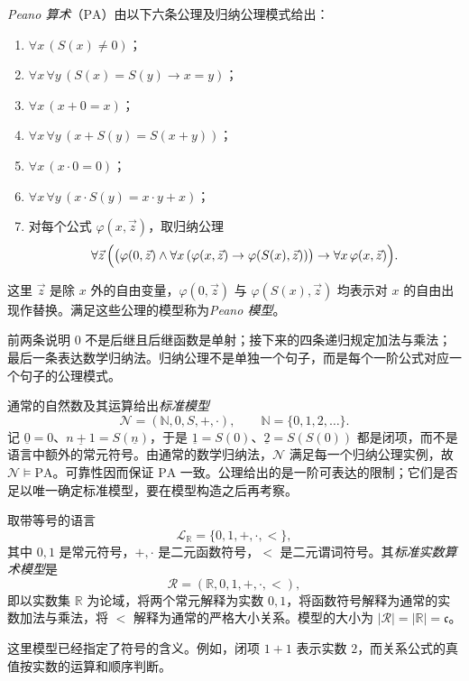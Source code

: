 \documentclass[lang=cn,a4paper,fontset=none,zihao=false,10pt,openany,twoside]{beautybook}
\numberwithin{algorithm}{chapter}
\newcommand{\N}{\mathbb N}
\newcommand{\R}{\mathbb R}
\begin{document}
\begin{definition}[Peano 公理]\label{def:pa}
\emph{Peano 算术}（$\mathrm{PA}$）由以下六条公理及归纳公理模式给出：
\begin{enumerate}[(1)]
\item $\forall x\,(S(x)\ne0)$；
\item $\forall x\,\forall y\,(S(x)=S(y)\to x=y)$；
\item $\forall x\,(x+0=x)$；
\item $\forall x\,\forall y\,(x+S(y)=S(x+y))$；
\item $\forall x\,(x\cdot0=0)$；
\item $\forall x\,\forall y\,(x\cdot S(y)=x\cdot y+x)$；
\item 对每个公式 $\varphi(x,\vec z)$，取归纳公理
\[
 \forall\vec z\,\Bigl(
 \bigl(\varphi(0,\vec z)\wedge
 \forall x\,(\varphi(x,\vec z)\to\varphi(S(x),\vec z))\bigr)
 \to\forall x\,\varphi(x,\vec z)\Bigr).
\]
\end{enumerate}
这里 $\vec z$ 是除 $x$ 外的自由变量，$\varphi(0,\vec z)$ 与 $\varphi(S(x),\vec z)$ 均表示对 $x$ 的自由出现作替换。满足这些公理的模型称为\emph{Peano 模型}。
\end{definition}
前两条说明 $0$ 不是后继且后继函数是单射；接下来的四条递归规定加法与乘法；最后一条表达数学归纳法。归纳公理不是单独一个句子，而是每个一阶公式对应一个句子的公理模式。

通常的自然数及其运算给出\emph{标准模型}
\[
 \mathcal N=(\N,0,S,+,\cdot),\qquad\N=\{0,1,2,\ldots\}.
\]
记 $\underline{0}=0$、$\underline{n+1}=S(\underline n)$，于是 $\underline1=S(0)$、$\underline2=S(S(0))$ 都是闭项，而不是语言中额外的常元符号。由通常的数学归纳法，$\mathcal N$ 满足每一个归纳公理实例，故 $\mathcal N\models\mathrm{PA}$。可靠性因而保证 $\mathrm{PA}$ 一致。公理给出的是一阶可表达的限制；它们是否足以唯一确定标准模型，要在模型构造之后再考察。

\begin{definition}[实数算术模型]\label{def:real-arithmetic}
取带等号的语言
\[
 \mathcal L_{\R}=\{0,1,+,\cdot,<\},
\]
其中 $0,1$ 是常元符号，$+,\cdot$ 是二元函数符号，$<$ 是二元谓词符号。其\emph{标准实数算术模型}是
\[
 \mathcal R=(\R,0,1,+,\cdot,<),
\]
即以实数集 $\R$ 为论域，将两个常元解释为实数 $0,1$，将函数符号解释为通常的实数加法与乘法，将 $<$ 解释为通常的严格大小关系。模型的大小为 $|\mathcal R|=|\R|=\mathfrak c$。
\end{definition}
这里模型已经指定了符号的含义。例如，闭项 $1+1$ 表示实数 $2$，而关系公式的真值按实数的运算和顺序判断。
\end{document}
